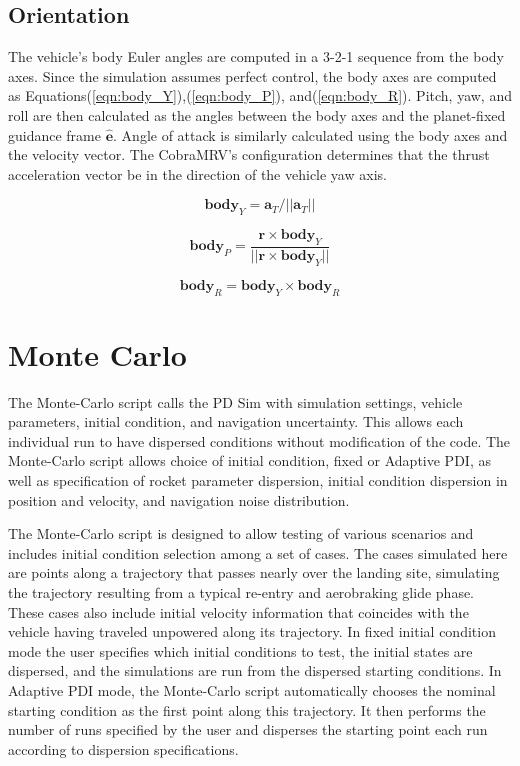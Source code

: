 \subsection{Orientation}
The vehicle's body Euler angles are computed in a 3-2-1 sequence from the body axes. Since the simulation assumes perfect control, the body axes are computed as Equations\:(\ref{eqn:body_Y}),\:(\ref{eqn:body_P}), and\:(\ref{eqn:body_R}). Pitch, yaw, and roll are then calculated as the angles between the body axes and the planet-fixed guidance frame $\hat{\bm{e}}$. Angle of attack is similarly calculated using the body axes and the velocity vector. The CobraMRV's configuration determines that the thrust acceleration vector be in the direction of the vehicle yaw axis.

\begin{equation}
\label{eqn:body_Y}
\bm{body}_Y = \bm{a}_T/||\bm{a}_T||
\end{equation}

\begin{equation}
\label{eqn:body_P}
\bm{body}_P = \frac{\bm{r} \times \bm{body}_Y}{||\bm{r} \times \bm{body}_Y||}
\end{equation}

\begin{equation}
\label{eqn:body_R}
\bm{body}_R = \bm{body}_Y \times \bm{body}_R
\end{equation}

\section{Monte Carlo}
The Monte-Carlo script calls the PD Sim with simulation settings, vehicle parameters, initial condition, and navigation uncertainty. This allows each individual run to have dispersed conditions without modification of the code. The Monte-Carlo script allows choice of initial condition, fixed or Adaptive PDI, as well as specification of rocket parameter dispersion, initial condition dispersion in position and velocity, and navigation noise distribution.

The Monte-Carlo script is designed to allow testing of various scenarios and includes initial condition selection among a set of cases. The cases simulated here are points along a trajectory that passes nearly over the landing site, simulating the trajectory resulting from a typical re-entry and aerobraking glide phase. These cases also include initial velocity information that coincides with the vehicle having traveled unpowered along its trajectory. In fixed initial condition mode the user specifies which initial conditions to test, the initial states are dispersed, and the simulations are run from the dispersed starting conditions. In Adaptive PDI mode, the Monte-Carlo script automatically chooses the nominal starting condition as the first point along this trajectory. It then performs the number of runs specified by the user and disperses the starting point each run according to dispersion specifications.

